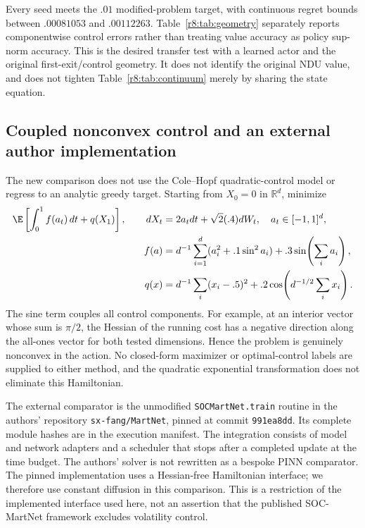 Every seed meets the $.01$ modified-problem target, with continuous regret bounds between $.00081053$ and $.00112263$. Table~\ref{r8:tab:geometry} separately reports componentwise control errors rather than treating value accuracy as policy sup-norm accuracy. This is the desired transfer test with a learned actor and the original first-exit/control geometry. It does not identify the original NDU value, and does not tighten Table~\ref{r8:tab:continuum} merely by sharing the state equation.

\subsection{Coupled nonconvex control and an external author implementation}\label{r8:external}
The new comparison does not use the Cole--Hopf quadratic-control model or regress to an analytic greedy target. Starting from $X_0=0$ in $\mathbb R^d$, minimize
\begin{align}
 \E\left[\int_0^1 f(a_t)\,dt+q(X_1)\right],\qquad
 dX_t&=2a_tdt+\sqrt{2}(.4)dW_t,\quad a_t\in[-1,1]^d,\\
 f(a)&=d^{-1}\sum_{i=1}^d(a_i^2+.1\sin^2a_i)+.3\sin\!\left(\sum_i a_i\right),\\
 q(x)&=d^{-1}\sum_i(x_i-.5)^2+.2\cos\!\left(d^{-1/2}\sum_i x_i\right).\label{r8:nonconvex}
\end{align}
The sine term couples all control components. For example, at an interior vector whose sum is $\pi/2$, the Hessian of the running cost has a negative direction along the all-ones vector for both tested dimensions. Hence the problem is genuinely nonconvex in the action. No closed-form maximizer or optimal-control labels are supplied to either method, and the quadratic exponential transformation does not eliminate this Hamiltonian.

The external comparator is the unmodified \texttt{SOCMartNet.train} routine in the authors' repository \texttt{sx-fang/MartNet}, pinned at commit \texttt{991ea8dd}. Its complete module hashes are in the execution manifest. The integration consists of model and network adapters and a scheduler that stops after a completed update at the time budget. The authors' solver is not rewritten as a bespoke PINN comparator. The pinned implementation uses a Hessian-free Hamiltonian interface; we therefore use constant diffusion in this comparison. This is a restriction of the implemented interface used here, not an assertion that the published SOC-MartNet framework excludes volatility control.

